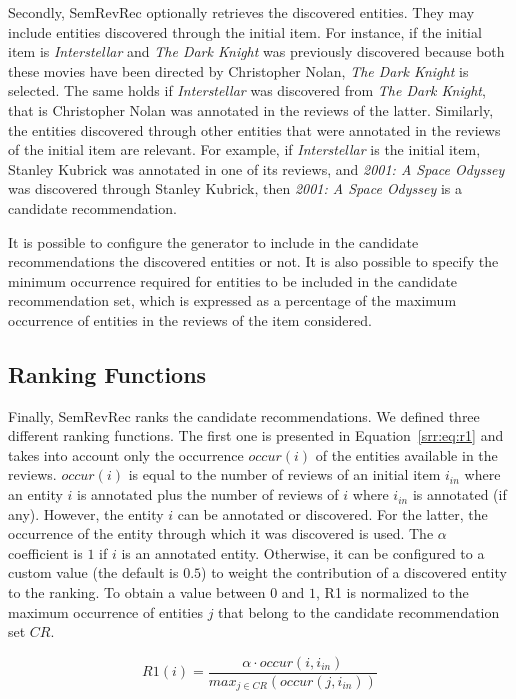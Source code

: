 Secondly, SemRevRec optionally retrieves the discovered entities. They may include entities discovered through the initial item. For instance, if the initial item is \emph{Interstellar} and \emph{The Dark Knight} was previously discovered because both these movies have been directed by Christopher Nolan, \emph{The Dark Knight} is selected. The same holds if \emph{Interstellar} was discovered from \emph{The Dark Knight}, that is Christopher Nolan was annotated in the reviews of the latter. Similarly, the entities discovered through other entities that were annotated in the reviews of the initial item are relevant. For example, if \emph{Interstellar} is the initial item, Stanley Kubrick was annotated in one of its reviews, and \emph{2001: A Space Odyssey} was discovered through Stanley Kubrick, then \emph{2001: A Space Odyssey} is a candidate recommendation.

It is possible to configure the generator to include in the candidate recommendations the discovered entities or not. It is also possible to specify the minimum occurrence required for entities to be included in the candidate recommendation set, which is expressed as a percentage of the maximum occurrence of entities in the reviews of the item considered.

\subsection{Ranking Functions}
\label{srr:sec:ranking}

Finally, SemRevRec ranks the candidate recommendations. We defined three different ranking functions. The first one is presented in Equation~\ref{srr:eq:r1} and takes into account only the occurrence $occur(i)$ of the entities available in the reviews. $occur(i)$ is equal to the number of reviews of an initial item $i_{in}$ where an entity $i$ is annotated plus the number of reviews of $i$ where $i_{in}$ is annotated (if any). However, the entity $i$ can be annotated or discovered. For the latter, the occurrence of the entity through which it was discovered is used. The $\alpha$ coefficient is $1$ if $i$ is an annotated entity. Otherwise, it can be configured to a custom value (the default is $0.5$) to weight the contribution of a discovered entity to the ranking. To obtain a value between $0$ and $1$, R1 is normalized to the maximum occurrence of entities $j$ that belong to the candidate recommendation set $CR$.

\begin{equation}
\label{srr:eq:r1}
\mathit{R1}(i) = \frac{\alpha \cdot \mathit{occur(i, i_{in})}}{max_{j \in \mathit{CR}}(\mathit{occur(j, i_{in})})}
\end{equation}

